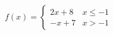 {$f(x) = \left\{\begin{array}{cc} 2x+8 & x \leq -1 \\ -x+7 & x>-1 \end{array}\right.$}
{\text{}\\ \label{fig:01_05_ex_07}}
